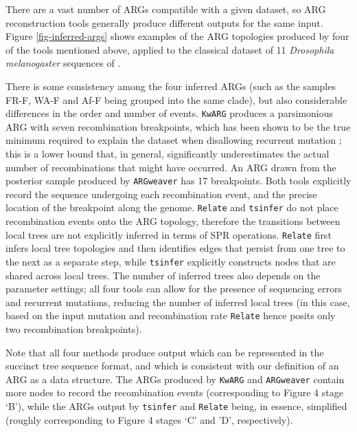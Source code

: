 \documentclass{article}
\begin{document}
There are a vast number of ARGs compatible with a given dataset, so ARG reconstruction tools generally produce different outputs for the same input. Figure \ref{fig-inferred-args} shows examples of the ARG topologies produced by four of the tools mentioned above, applied to the classical dataset of 11 \emph{Drosophila melanogaster} sequences of \citet{kreitman1983nucleotide}.

There is some consistency among the four inferred ARGs (such as the samples FR-F, WA-F and Af-F being grouped into the same clade), but also considerable differences in the order and number of events. \texttt{KwARG} \citep{ignatieva2021kwarg} produces a parsimonious ARG with seven recombination breakpoints, which has been shown to be the true minimum required to explain the dataset when disallowing recurrent mutation \citep{song2003parsimonious}; this is a lower bound that, in general, significantly underestimates the actual number of recombinations that might have occurred. An ARG drawn from the posterior sample produced by \texttt{ARGweaver} has 17 breakpoints. Both tools explicitly record the sequence undergoing each recombination event, and the precise location of the breakpoint along the genome. \texttt{Relate} \citep{speidel2019method} and \texttt{tsinfer} \citep{kelleher2019inferring} do not place recombination events onto the ARG topology, therefore the transitions between local trees are not explicitly inferred in terms of SPR operations. \texttt{Relate} first infers local tree topologies and then identifies edges that persist from one tree to the next as a separate step, while \texttt{tsinfer} explicitly constructs nodes that are shared across local trees. The number of inferred trees also depends on the parameter settings; all four tools can allow for the presence of sequencing errors and recurrent mutations, reducing the number of inferred local trees (in this case, based on the input mutation and recombination rate \texttt{Relate} hence posits only two recombination breakpoints).

Note that all four methods produce output which can be represented in the succinct tree sequence format, and which is consistent with our definition of an ARG as a data structure. The ARGs produced by \texttt{KwARG} and \texttt{ARGweaver} contain more nodes to record the recombination events (corresponding to Figure 4 stage `B'), while the ARGs output by \texttt{tsinfer} and \texttt{Relate} being, in essence, simplified (roughly corresponding to Figure 4 stages `C' and 'D', respectively).
\end{document}
